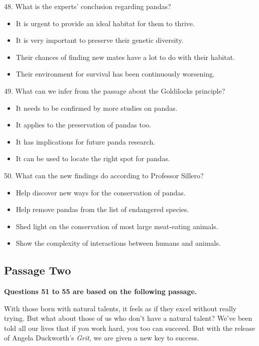 \documentclass[UTF8,11pt]{ctexart}
\begin{document}
48. What is the experts’ conclusion regarding pandas?


\begin{itemize}[leftmargin=2em,itemsep=.2em,topsep=.4em]\item[A.] It is urgent to provide an ideal habitat for them to thrive.
\item[B.] It is very important to preserve their genetic diversity.
\item[C.] Their chances of finding new mates have a lot to do with their habitat.
\item[D.] Their environment for survival has been continuously worsening.
\end{itemize}

49. What can we infer from the passage about the Goldilocks principle?


\begin{itemize}[leftmargin=2em,itemsep=.2em,topsep=.4em]\item[A.] It needs to be confirmed by more studies on pandas.
\item[B.] It applies to the preservation of pandas too.
\item[C.] It has implications for future panda research.
\item[D.] It can be used to locate the right spot for pandas.
\end{itemize}

50. What can the new findings do according to Professor Sillero?


\begin{itemize}[leftmargin=2em,itemsep=.2em,topsep=.4em]\item[A.] Help discover new ways for the conservation of pandas.
\item[B.] Help remove pandas from the list of endangered species.
\item[C.] Shed light on the conservation of most large meat-eating animals.
\item[D.] Show the complexity of interactions between humans and animals.
\end{itemize}

\subsection*{\textbf{Passage Two}}


\textbf{Questions 51 to 55 are based on the following passage.}


With those born with natural talents, it feels as if they excel without really trying. But what about those of us who don’t have a natural talent? We’ve been told all our lives that if you work hard, you too can succeed. But with the release of Angela Duckworth’s \textit{Grit}, we are given a new key to success.
\end{document}
